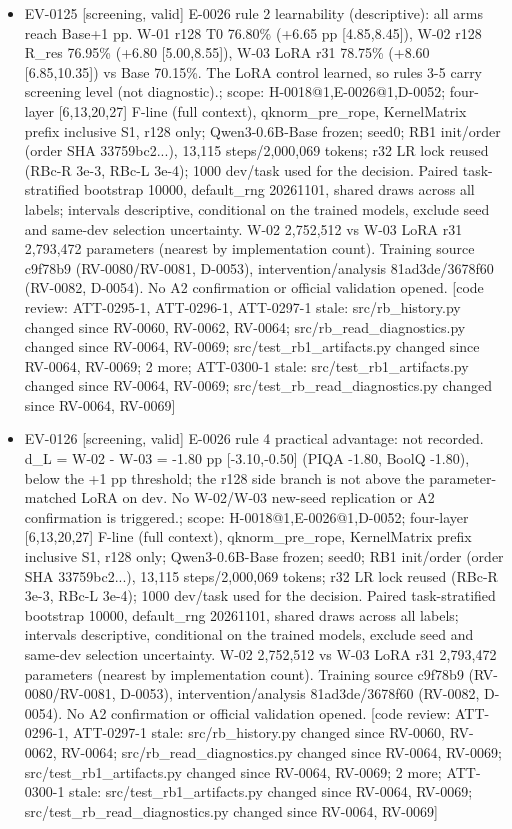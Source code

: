\documentclass[11pt]{article}
\begin{document}
\begin{itemize}
\item EV-0125 [screening, valid] E-0026 rule 2 learnability (descriptive): all arms reach Base+1 pp. W-01 r128 T0 76.80\% (+6.65 pp [4.85,8.45]), W-02 r128 R\_res 76.95\% (+6.80 [5.00,8.55]), W-03 LoRA r31 78.75\% (+8.60 [6.85,10.35]) vs Base 70.15\%. The LoRA control learned, so rules 3-5 carry screening level (not diagnostic).; scope: H-0018@1,E-0026@1,D-0052; four-layer [6,13,20,27] F-line (full context), qknorm\_pre\_rope, KernelMatrix prefix inclusive S1, r128 only; Qwen3-0.6B-Base frozen; seed0; RB1 init/order (order SHA 33759bc2...), 13,115 steps/2,000,069 tokens; r32 LR lock reused (RBc-R 3e-3, RBc-L 3e-4); 1000 dev/task used for the decision. Paired task-stratified bootstrap 10000, default\_rng 20261101, shared draws across all labels; intervals descriptive, conditional on the trained models, exclude seed and same-dev selection uncertainty. W-02 2,752,512 vs W-03 LoRA r31 2,793,472 parameters (nearest by implementation count). Training source c9f78b9 (RV-0080/RV-0081, D-0053), intervention/analysis 81ad3de/3678f60 (RV-0082, D-0054). No A2 confirmation or official validation opened. [code review: ATT-0295-1, ATT-0296-1, ATT-0297-1 stale: src/rb\_history.py changed since RV-0060, RV-0062, RV-0064; src/rb\_read\_diagnostics.py changed since RV-0064, RV-0069; src/test\_rb1\_artifacts.py changed since RV-0064, RV-0069; 2 more; ATT-0300-1 stale: src/test\_rb1\_artifacts.py changed since RV-0064, RV-0069; src/test\_rb\_read\_diagnostics.py changed since RV-0064, RV-0069]
\item EV-0126 [screening, valid] E-0026 rule 4 practical advantage: not recorded. d\_L = W-02 - W-03 = -1.80 pp [-3.10,-0.50] (PIQA -1.80, BoolQ -1.80), below the +1 pp threshold; the r128 side branch is not above the parameter-matched LoRA on dev. No W-02/W-03 new-seed replication or A2 confirmation is triggered.; scope: H-0018@1,E-0026@1,D-0052; four-layer [6,13,20,27] F-line (full context), qknorm\_pre\_rope, KernelMatrix prefix inclusive S1, r128 only; Qwen3-0.6B-Base frozen; seed0; RB1 init/order (order SHA 33759bc2...), 13,115 steps/2,000,069 tokens; r32 LR lock reused (RBc-R 3e-3, RBc-L 3e-4); 1000 dev/task used for the decision. Paired task-stratified bootstrap 10000, default\_rng 20261101, shared draws across all labels; intervals descriptive, conditional on the trained models, exclude seed and same-dev selection uncertainty. W-02 2,752,512 vs W-03 LoRA r31 2,793,472 parameters (nearest by implementation count). Training source c9f78b9 (RV-0080/RV-0081, D-0053), intervention/analysis 81ad3de/3678f60 (RV-0082, D-0054). No A2 confirmation or official validation opened. [code review: ATT-0296-1, ATT-0297-1 stale: src/rb\_history.py changed since RV-0060, RV-0062, RV-0064; src/rb\_read\_diagnostics.py changed since RV-0064, RV-0069; src/test\_rb1\_artifacts.py changed since RV-0064, RV-0069; 2 more; ATT-0300-1 stale: src/test\_rb1\_artifacts.py changed since RV-0064, RV-0069; src/test\_rb\_read\_diagnostics.py changed since RV-0064, RV-0069]

\end{itemize}
\end{document}
